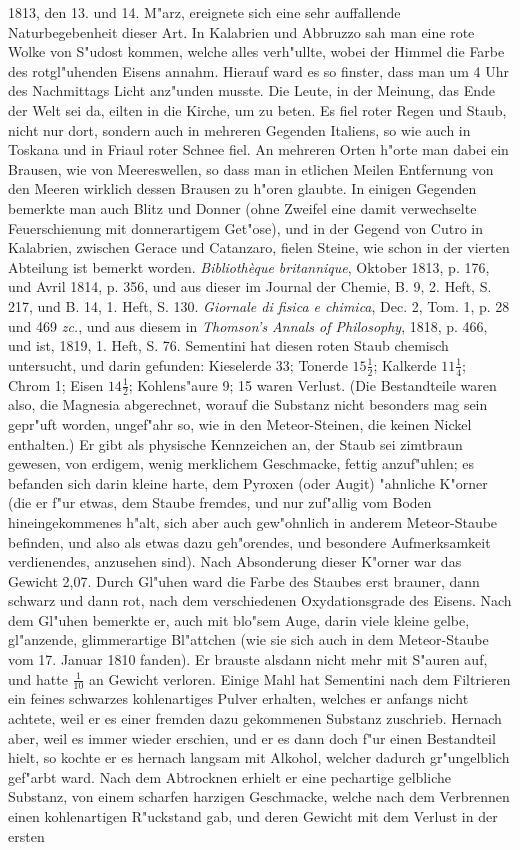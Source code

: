 \documentclass[a4paper, 11pt, oneside, polutonikogreek, german]{article}
\begin{document}
1813, den 13. und 14. M"arz, ereignete sich eine sehr auffallende Naturbegebenheit dieser Art. In Kalabrien und Abbruzzo sah man eine rote Wolke von S"udost kommen, welche alles verh"ullte, wobei der Himmel die Farbe des rotgl"uhenden Eisens annahm. Hierauf ward es so finster, dass man um 4 Uhr des Nachmittags Licht anz"unden musste. Die Leute, in der Meinung, das Ende der Welt sei da, eilten in die Kirche, um zu beten. Es fiel roter Regen und Staub, nicht nur dort, sondern auch in mehreren Gegenden Italiens, so wie auch in Toskana und in Friaul roter Schnee fiel. An mehreren Orten h"orte man dabei ein Brausen, wie von Meereswellen, so dass man in etlichen Meilen Entfernung von den Meeren wirklich dessen Brausen zu h"oren glaubte. In einigen Gegenden bemerkte man auch Blitz und Donner (ohne Zweifel eine damit verwechselte Feuerschienung mit donnerartigem Get"ose), und in der Gegend von Cutro in Kalabrien, zwischen Gerace und Catanzaro, fielen Steine, wie schon in der vierten Abteilung ist bemerkt worden. \emph{Bibliothèque britannique}, Oktober 1813, p. 176, und Avril 1814, p. 356, und aus dieser im Journal der Chemie, B. 9, 2. Heft, S. 217, und B. 14, 1. Heft, S. 130. \emph{Giornale di fisica e chimica}, Dec. 2, Tom. 1, p. 28 und 469 \emph{zc.}, und aus diesem in \emph{Thomson's Annals of Philosophy}, 1818, p. 466, und ist, 1819, 1. Heft, S. 76. Sementini hat diesen roten Staub chemisch untersucht, und darin gefunden: Kieselerde 33; Tonerde $\mathfrak{15\frac{1}{2}}$; Kalkerde $\mathfrak{11\frac{1}{4}}$; Chrom 1; Eisen $\mathfrak{14\frac{1}{2}}$; Kohlens"aure 9; 15 waren Verlust. (Die Bestandteile waren also, die Magnesia abgerechnet, worauf die Substanz nicht besonders mag sein gepr"uft worden, ungef"ahr so, wie in den Meteor-Steinen, die keinen Nickel enthalten.) Er gibt als physische Kennzeichen an, der Staub sei zimtbraun gewesen, von erdigem, wenig merklichem Geschmacke, fettig anzuf"uhlen; es befanden sich darin kleine harte, dem Pyroxen (oder Augit) "ahnliche K"orner (die er f"ur etwas, dem Staube fremdes, und nur zuf"allig vom Boden hineingekommenes h"alt, sich aber auch gew"ohnlich in anderem Meteor-Staube befinden, und also als etwas dazu geh"orendes, und besondere Aufmerksamkeit verdienendes, anzusehen sind). Nach Absonderung dieser K"orner war das Gewicht 2,07. Durch Gl"uhen ward die Farbe des Staubes erst brauner, dann schwarz und dann rot, nach dem verschiedenen Oxydationsgrade des Eisens. Nach dem Gl"uhen bemerkte er, auch mit blo"sem Auge, darin viele kleine gelbe, gl"anzende, glimmerartige Bl"attchen (wie sie sich auch in dem Meteor-Staube vom 17. Januar 1810 fanden). Er brauste alsdann nicht mehr mit S"auren auf, und hatte $\mathfrak{\frac{1}{10}}$ an Gewicht verloren. Einige Mahl hat Sementini nach dem Filtrieren ein feines schwarzes kohlenartiges Pulver erhalten, welches er anfangs nicht achtete, weil er es einer fremden dazu gekommenen Substanz zuschrieb. Hernach aber, weil es immer wieder erschien, und er es dann doch f"ur einen Bestandteil hielt, so kochte er es hernach langsam mit Alkohol, welcher dadurch gr"ungelblich gef"arbt ward. Nach dem Abtrocknen erhielt er eine pechartige gelbliche Substanz, von einem scharfen harzigen Geschmacke, welche nach dem Verbrennen einen kohlenartigen R"uckstand gab, und deren Gewicht mit dem Verlust in der ersten 
\end{document}
